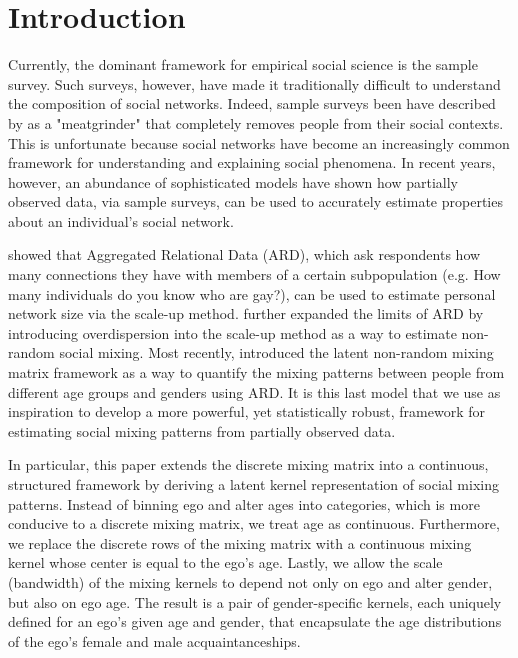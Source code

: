 \section{Introduction}
\label{sec:kernel_introduction}

Currently, the dominant framework for empirical social science is the sample survey. Such surveys, however, have made it traditionally difficult to understand the composition of social networks. Indeed, sample surveys been have described by \citet{Barton:1968} as a "meatgrinder" that completely removes people from their social contexts. This is unfortunate because social networks have become an increasingly common framework for understanding and explaining social phenomena. In recent years, however, an abundance of sophisticated models have shown how partially observed data, via sample surveys, can be used to accurately estimate properties about an individual's social network.

\citet{McCarty+others:2001} showed that Aggregated Relational Data (ARD), which ask respondents how many connections they have with members of a certain subpopulation (e.g. How many individuals do you know who are gay?), can be used to estimate personal network size via the scale-up method. \citet{Zheng+others:2006} further expanded the limits of ARD by introducing overdispersion into the scale-up method as a way to estimate non-random social mixing. Most recently, \citet{McCormick+others:2010} introduced the latent non-random mixing matrix framework as a way to quantify the mixing patterns between people from different age groups and genders using ARD. It is this last model that we use as inspiration to develop a more powerful, yet statistically robust, framework for estimating social mixing patterns from partially observed data.

In particular, this paper extends the discrete \citet{McCormick+others:2010} mixing matrix into a continuous, structured framework by deriving a latent kernel representation of social mixing patterns. Instead of binning ego and alter ages into categories, which is more conducive to a discrete mixing matrix, we treat age as continuous. Furthermore, we replace the discrete rows of the mixing matrix with a continuous mixing kernel whose center is equal to the ego's age. Lastly, we allow the scale (bandwidth) of the mixing kernels to depend not only on ego and alter gender, but also on ego age. The result is a pair of gender-specific kernels, each uniquely defined for an ego's given age and gender, that encapsulate the age distributions of the ego's female and male acquaintanceships.

